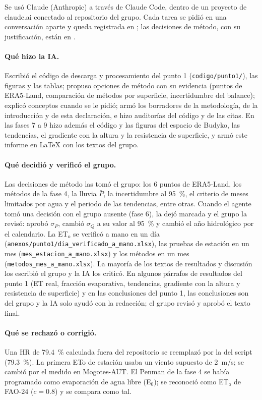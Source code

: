 \documentclass[11pt,letterpaper]{article}
\newcommand{\ETo}{ET$_\mathrm{o}$}
\begin{document}
Se usó Claude (Anthropic) a través de Claude Code, dentro de un proyecto de claude.ai conectado al repositorio del
grupo. Cada tarea se pidió en una conversación aparte y queda registrada en ; las
decisiones de método, con su justificación, están en .

\paragraph{Qué hizo la IA.} Escribió el código de descarga y procesamiento del punto 1 (\texttt{codigo/punto1/}),
las figuras y las tablas; propuso opciones de método con su evidencia (puntos de ERA5-Land, comparación de métodos por
superficie, incertidumbre del balance); explicó conceptos cuando se le pidió; armó los borradores de la metodología,
de la introducción y de esta declaración, e hizo auditorías del código y de las citas. En las fases 7 a 9 hizo además
el código y las figuras del espacio de Budyko, las tendencias, el gradiente con la altura y la resistencia de
superficie, y armó este informe en LaTeX con los textos del grupo.

\paragraph{Qué decidió y verificó el grupo.} Las decisiones de método las tomó el grupo: los 6 puntos de ERA5-Land,
los métodos de la fase 4, la lluvia $\bar{P}$, la incertidumbre al 95~\%, el criterio de meses limitados por agua y el
periodo de las tendencias, entre otras. Cuando el agente tomó una decisión con el grupo ausente (fase 6), la dejó
marcada y el grupo la revisó: aprobó $\sigma_P$, cambió $\sigma_Q$ a su valor al 95~\% y cambió el año hidrológico por
el calendario. La \ETo{} se verificó a mano en un día (\texttt{anexos/punto1/dia\_verificado\_a\_mano.xlsx}), las
pruebas de estación en un mes (\texttt{mes\_estacion\_a\_mano.xlsx}) y los métodos en un mes
(\texttt{metodos\_mes\_a\_mano.xlsx}). La mayoría de los textos de resultados y discusión los escribió
el grupo y la IA los criticó. En algunos párrafos de resultados del punto 1 (ET real, fracción evaporativa, tendencias,
gradiente con la altura y resistencia de superficie) y en las conclusiones del punto 1, las conclusiones son del grupo
y la IA solo ayudó con la redacción; el grupo revisó y aprobó el texto final.

\paragraph{Qué se rechazó o corrigió.} Una HR de 79.4~\% calculada fuera del repositorio se reemplazó por la del
script (79.3~\%). La primera ETo de estación usaba un viento supuesto de 2~m/s; se cambió por el medido en
Mogotes-AUT. El Penman de la fase 4 se había programado como evaporación de agua libre (E$_0$); se reconoció como \ETo{} de FAO-24 ($c = 0.8$) y se compara como tal.
\end{document}
